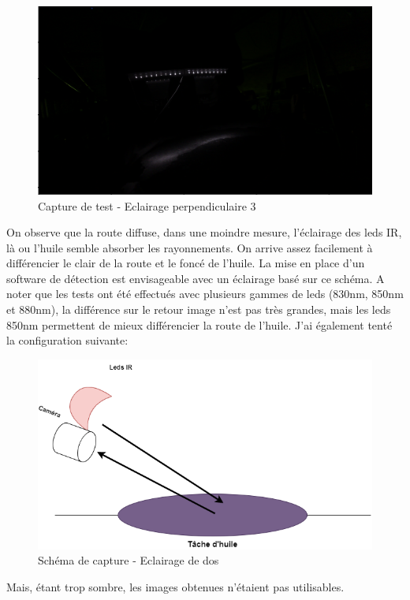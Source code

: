 \begin{figure}[H]
    \centering
    \includegraphics[width=13cm]{assets/figures/eclairage_perpendiculaire3.png}
    \caption{Capture de test - Eclairage perpendiculaire 3}
\end{figure}
On observe que la route diffuse, dans une moindre mesure, l'éclairage des leds IR, là ou l'huile semble absorber les rayonnements. On arrive
assez facilement à différencier le clair de la route et le foncé de l'huile. La mise en place d'un software de détection est envisageable avec
un éclairage basé sur ce schéma. A noter que les tests ont été effectués avec plusieurs gammes de leds (830nm, 850nm et 880nm), la différence
sur le retour image n'est pas très grandes, mais les leds 850nm permettent de mieux différencier la route de l'huile.
\newpage
J'ai également tenté la configuration suivante:
\begin{figure}[H]
    \centering
    \includegraphics[width=13cm]{assets/figures/eclairage_dos.png}
    \caption{Schéma de capture - Eclairage de dos}
\end{figure}
Mais, étant trop sombre, les images obtenues n'étaient pas utilisables.
\newpage
